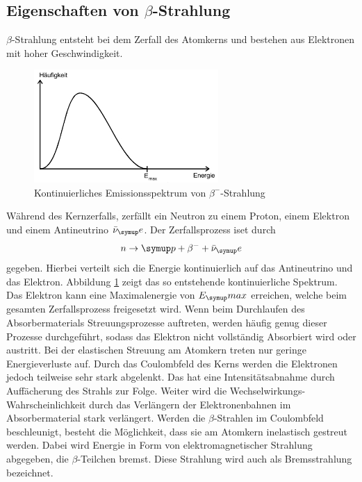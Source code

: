 \subsection{Eigenschaften von \texorpdfstring{$\beta$}{beta}-Strahlung}
$\beta$-Strahlung entsteht bei dem Zerfall des Atomkerns und bestehen aus
Elektronen mit hoher Geschwindigkeit.
\begin{figure}
  \includegraphics[width=7cm]{bilder/emissionbeta.jpg}
  \caption{Kontinuierliches Emissionsspektrum von $\beta^-$-Strahlung}
  \label{fig:emib}
\end{figure}
Während des Kernzerfalls, zerfällt ein Neutron zu einem Proton, einem Elektron
und einem Antineutrino $\bar\nu_\su{e}$. Der Zerfallsprozess iset durch
\begin{equation*}
  n \rightarrow \su{p + \beta^- + \bar\nu_\su{e}}
\end{equation*}
gegeben.
Hierbei verteilt sich die Energie kontinuierlich auf das Antineutrino und das
Elektron. Abbildung \ref{fig:emib} zeigt das so entstehende kontinuierliche Spektrum.
Das Elektron kann eine Maximalenergie von $E_\su{max}$ erreichen, welche beim
gesamten Zerfallsprozess freigesetzt wird.
Wenn beim Durchlaufen des Absorbermaterials Streuungsprozesse auftreten, werden
häufig genug dieser Prozesse durchgeführt, sodass das Elektron nicht vollständig
Absorbiert wird oder austritt.
Bei der elastischen Streuung am Atomkern treten nur geringe Energieverluste auf.
Durch das Coulombfeld des Kerns werden die Elektronen jedoch teilweise sehr stark
abgelenkt. Das hat eine Intensitätsabnahme durch Auffächerung des Strahls zur Folge.
Weiter wird die Wechselwirkungs-Wahrscheinlichkeit durch das Verlängern der
Elektronenbahnen im Absorbermaterial stark verlängert.
Werden die $\beta$-Strahlen im Coulombfeld beschleunigt, besteht die Möglichkeit,
dass sie am Atomkern inelastisch gestreut werden. Dabei wird Energie in Form
von elektromagnetischer Strahlung abgegeben, die $\beta$-Teilchen bremst. Diese
Strahlung wird auch als Bremsstrahlung bezeichnet.

